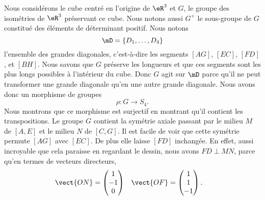 \begin{wrapfigure}{r}{6.0cm}
	\vspace{-0.5cm}        %
	\centering
	
\end{wrapfigure}
Nous considérons le cube centré en l'origine de \( \eR^3\) et \( G\), le groupe des isométries de \( \eR^3\) préservant ce cube. Nous notons aussi \( G^+\) le sous-groupe de \( G\) constitué des éléments de déterminant positif. Nous notons
\begin{equation}
	\mD=\{ D_1,\ldots, D_4 \}
\end{equation}
l'ensemble des grandes diagonales, c'est-à-dire les segments \( [AG]\), \( [EC]\), \( [FD]\), et \( [BH]\). Nous savons que \( G\) préserve les longueurs et que ces segments sont les plus longs possibles à l'intérieur du cube. Donc \( G\) agit sur \( \mD\) parce qu'il ne peut transformer une grande diagonale qu'en une autre grande diagonale. Nous avons donc un morphisme de groupes
\begin{equation}
	\rho\colon G\to S_4.
\end{equation}
Nous montrons que ce morphisme est surjectif en montrant qu'il contient les transpositions. Le groupe \( G\) contient la symétrie axiale passant par le milieu \( M\) de \( [A,E]\) et le milieu \( N\) de \( [C,G]\). Il est facile de voir que cette symétrie permute \( [AG]\) avec \( [EC]\). De plus elle laisse \( [FD]\) inchangée. En effet, aussi incroyable que cela paraisse en regardant le dessin, nous avons \( FD\perp MN\), parce qu'en termes de vecteurs directeurs,
\begin{equation}
	\begin{aligned}[]
		\vect{ ON } & =\begin{pmatrix}
			1  \\
			-1 \\
			0
		\end{pmatrix} & \vect{ OF } & =\begin{pmatrix}
			1 \\
			1 \\
			-1
		\end{pmatrix}.
	\end{aligned}
\end{equation}

